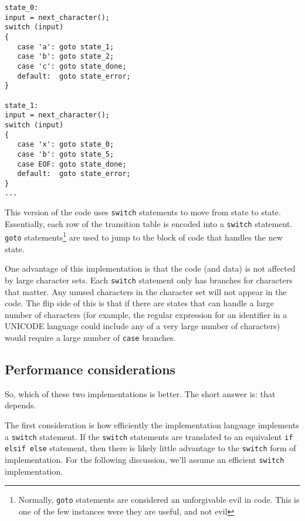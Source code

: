 \documentclass[letterpaper,12pt,openany,reqno]{book}%
\newcommand{\code}[1] {\lstinline[breaklines=yes,breakatwhitespace=yes]{#1}}
\begin{document}
\begin{lstlisting}[caption={Alternative pseudo-code for processing a transition table. This just a sample to illustrate the form of the code. The actual \code{switch} statements would be determined based on the transition table.},label=L.switchStatement]
state_0:
input = next_character();
switch (input)
{
   case 'a': goto state_1;
   case 'b': goto state_2;
   case 'c': goto state_done;
   default:  goto state_error;
}

state_1:
input = next_character();
switch (input)
{
   case 'x': goto state_0;
   case 'b': goto state_5;
   case EOF: goto state_done;
   default:  goto state_error;
}
...
\end{lstlisting}

This version of the code uses \code{switch} statements to move from state to state. Essentially, each row of the transition table is encoded into a \code{switch} statement. \code{goto} statements\footnote{Normally, \code{goto} statements are considered an unforgivable evil in code. This is one of the few instances were they are useful, and not evil} are used to jump to the block of code that handles the new state.

One advantage of this implementation is that the code (and data) is not affected by large character sets. Each \code{switch} statement only has branches for characters that matter. Any unused characters in the character set will not appear in the code. The flip side of this is that if there are states that can handle a large number of characters (for example, the regular expression for an identifier in a UNICODE language could include any of a very large number of characters) would require a large number of \code{case} branches.

\subsection{Performance considerations}\label{S.scannerperformance}
So, which of these two implementations is better. The short answer is: that depends.

The first consideration is how efficiently the implementation language implements a \code{switch} statement. If the \code{switch} statements are translated to an equivalent \code{if elsif else} statement, then there is likely little advantage to the \code{switch} form of implementation. For the following discussion, we'll assume an efficient \code{switch} implementation.
\end{document}
